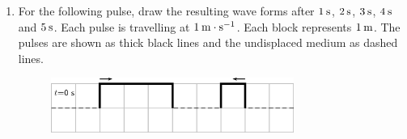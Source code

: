 \begin{enumerate}[noitemsep, label=\textbf{\arabic*}. ]
    \addtocounter{footnote}{-0}
            \label{m38802*uid60}\item For the following pulse, draw the resulting wave forms after \begin{math}1\phantom{\rule{2pt}{0ex}}\mathrm{s}\end{math}, \begin{math}2\phantom{\rule{2pt}{0ex}}\mathrm{s}\end{math}, \begin{math}3\phantom{\rule{2pt}{0ex}}\mathrm{s}\end{math}, \begin{math}4\phantom{\rule{2pt}{0ex}}\mathrm{s}\end{math} and \begin{math}5\phantom{\rule{2pt}{0ex}}\mathrm{s}\end{math}. Each pulse is travelling at \begin{math}1\phantom{\rule{2pt}{0ex}}\mathrm{m}\ensuremath{\cdot}\mathrm{s}{}^{-1}\end{math}. Each block represents \begin{math}1\phantom{\rule{2pt}{0ex}}\mathrm{m}\end{math}. The pulses are shown as thick black lines and the undisplaced medium as dashed lines.
    \setcounter{subfigure}{0}


	\begin{figure}[H] %
    \begin{center}
    \label{m38802*id316530!!!underscore!!!media}\label{m38802*id316530!!!underscore!!!printimage}\includegraphics[width=300px]{col11305.imgs/m38802_PG10C4_028.png} %
        
      \vspace{2pt}
    \vspace{.1in}
    
    \end{center}

 \end{figure}   


\end{enumerate}
